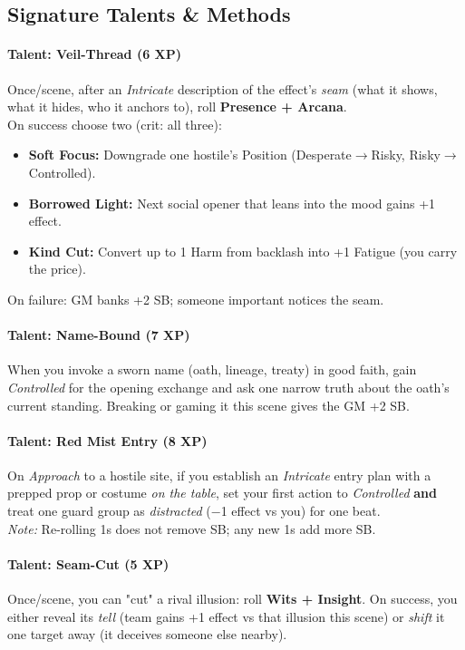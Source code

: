 \subsection{Signature Talents \& Methods}
\paragraph{Talent: Veil-Thread (6 XP)}
Once/scene, after an \emph{Intricate} description of the effect's \emph{seam} (what it shows, what it hides, who it anchors to), roll \textbf{Presence + Arcana}. \\
On success choose two (crit: all three):
\begin{itemize}
  \item \textbf{Soft Focus:} Downgrade one hostile's Position (Desperate$\to$Risky, Risky$\to$Controlled).
  \item \textbf{Borrowed Light:} Next social opener that leans into the mood gains +1 effect.
  \item \textbf{Kind Cut:} Convert up to 1 Harm from backlash into +1 Fatigue (you carry the price).
\end{itemize}
On failure: GM banks +2 SB; someone important notices the seam.

\paragraph{Talent: Name-Bound (7 XP)}
When you invoke a sworn name (oath, lineage, treaty) in good faith, gain \emph{Controlled} for the opening exchange and ask one narrow truth about the oath's current standing. Breaking or gaming it this scene gives the GM +2 SB.

\paragraph{Talent: Red Mist Entry (8 XP)}
On \emph{Approach} to a hostile site, if you establish an \emph{Intricate} entry plan with a prepped prop or costume \emph{on the table}, set your first action to \emph{Controlled} \textbf{and} treat one guard group as \emph{distracted} (−1 effect vs you) for one beat. \\
\emph{Note:} Re-rolling 1s does not remove SB; any new 1s add more SB.

\paragraph{Talent: Seam-Cut (5 XP)}
Once/scene, you can "cut" a rival illusion: roll \textbf{Wits + Insight}. On success, you either reveal its \emph{tell} (team gains +1 effect vs that illusion this scene) or \emph{shift} it one target away (it deceives someone else nearby).

